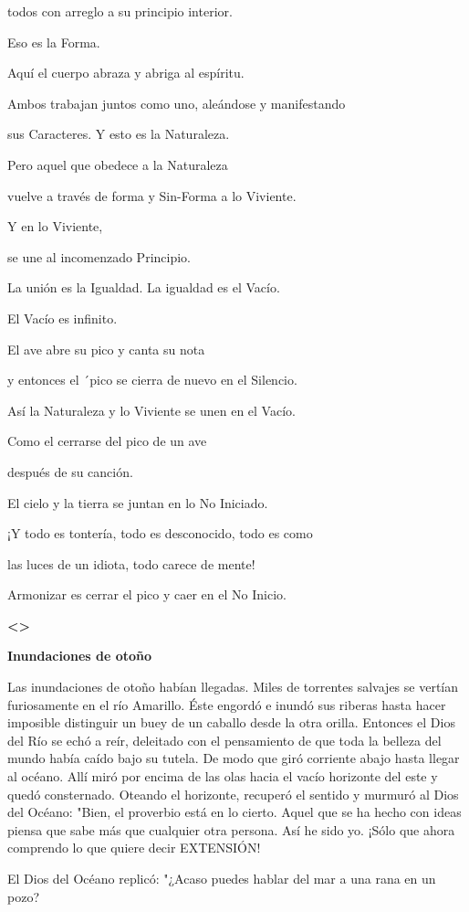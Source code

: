 todos con arreglo a su principio interior.

Eso es la Forma.

Aquí el cuerpo abraza y abriga al espíritu.

Ambos trabajan juntos como uno, aleándose y manifestando

sus Caracteres. Y esto es la Naturaleza.

Pero aquel que obedece a la Naturaleza

vuelve a través de forma y Sin-Forma a lo Viviente.

Y en lo Viviente,

se une al incomenzado Principio.

La unión es la Igualdad. La igualdad es el Vacío.

El Vacío es infinito.

El ave abre su pico y canta su nota

y entonces el ´pico se cierra de nuevo en el Silencio.

Así la Naturaleza y lo Viviente se unen en el Vacío.

Como el cerrarse del pico de un ave

después de su canción.

El cielo y la tierra se juntan en lo No Iniciado.

¡Y todo es tontería, todo es desconocido, todo es como

las luces de un idiota, todo carece de mente!

Armonizar es cerrar el pico y caer en el No Inicio.

\textbf{\textless\textgreater{}}

\textbf{{Inundaciones de otoño}}

Las inundaciones de otoño habían llegadas. Miles de torrentes salvajes
se vertían furiosamente en el río Amarillo. Éste engordó e inundó sus
riberas hasta hacer imposible distinguir un buey de un caballo desde la
otra orilla. Entonces el Dios del Río se echó a reír, deleitado con el
pensamiento de que toda la belleza del mundo había caído bajo su tutela.
De modo que giró corriente abajo hasta llegar al océano. Allí miró por
encima de las olas hacia el vacío horizonte del este y quedó
consternado. Oteando el horizonte, recuperó el sentido y murmuró al Dios
del Océano: "Bien, el proverbio está en lo cierto. Aquel que se ha hecho
con ideas piensa que sabe más que cualquier otra persona. Así he sido
yo. ¡Sólo que ahora comprendo lo que quiere decir EXTENSIÓN!

El Dios del Océano replicó: "¿Acaso puedes hablar del mar a una rana en
un pozo?

